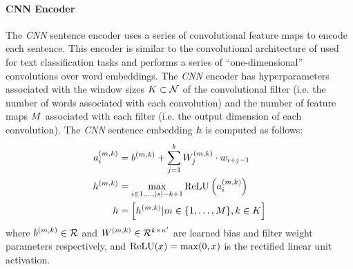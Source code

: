 
\paragraph{CNN Encoder} The \textit{CNN} sentence encoder uses a series of 
convolutional feature maps to encode each sentence. This encoder is similar
to the convolutional architecture of \cite{kim2014convolutional} used for text
classification
tasks and performs a series of ``one-dimensional'' convolutions over 
word embeddings. 
The \textit{CNN} encoder has hyperparameters
associated with the window sizes $K \subset \mathcal{N}$ of the convolutional filter 
(i.e. the number of words associated with each convolution) and the number of 
feature maps $M$ associated with each filter
(i.e. the output dimension of each 
convolution). 
The \textit{CNN} sentence embedding $\sentEmb$ is computed as follows:
\begin{align}
 \specActivation_i &= \specConvBias 
    + \sum^\filterWindowSize_{j=1} \specConvWeight_j \cdot \wemb_{i + j -1}\\
  \specFeatureMap &= \max_{i\in 1,\dots, |\sent| - \filterWindowSize + 1} 
                      \relu\left(\specActivation_i\right) \\
 \sentEmb &= \left[\specFeatureMap | 
   \numFeatureMaps \in \{1, \ldots, \maxFeatureMaps\},
   \filterWindowSize \in \maxWindowSize
   \right]
\end{align}
where $b^{(m,k)}\in\mathcal{R}$ and $W^{(m,k)} \in 
\mathcal{R}^{k \times {n^\prime}}$ are learned bias and filter
weight parameters respectively, and $\operatorname{ReLU}(x) = \max(0, x)$ is the rectified
linear unit activation.



